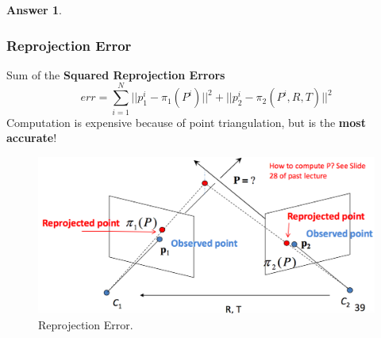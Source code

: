 \documentclass[a4paper,12 pt]{article}
\theoremstyle{definition}
\theoremstyle{remark}
\theoremstyle{definition}
\theoremstyle{definition}
\theoremstyle{definition}
\theoremstyle{definition}
\theoremstyle{remark}
\theoremstyle{remark}
\theoremstyle{definition}
\theoremstyle{definition}
\newtheorem*{answer}{Answer}
\begin{document}
\begin{enumerate}
\begin{answer}
\subsubsection*{Reprojection Error}
Sum of the \textbf{Squared Reprojection Errors}
\begin{equation}
err=\sum_{i=1}^N ||p_1^i-\pi_1(P^i)||^2+||p_2^i-\pi_2(P^i,R,T)||^2
\end{equation}
Computation is expensive because of point triangulation, but is the \textbf{most accurate}!
\begin{figure}[h!]
\begin{center}
\includegraphics[scale=0.2]{pics/repro}
\caption{Reprojection Error. \label{fig:repro}}
\end{center}
\end{figure}
\end{answer}
\end{enumerate}
\end{document}
